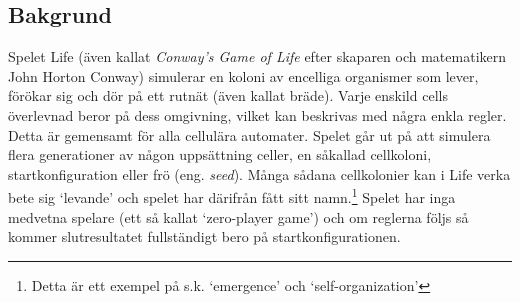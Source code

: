 



%
%

\subsection{Bakgrund}

Spelet Life (även kallat \emph{Conway's Game of Life} efter skaparen och matematikern John Horton Conway) simulerar en koloni av encelliga organismer som lever, förökar sig och dör på ett rutnät (även kallat bräde). Varje enskild cells överlevnad beror på dess omgivning, vilket kan beskrivas med några enkla regler. Detta är gemensamt för alla cellulära automater. Spelet går ut på att simulera flera generationer av någon uppsättning celler, en såkallad cellkoloni, startkonfiguration eller frö (eng. \textit{seed}). Många sådana cellkolonier kan i Life verka bete sig `levande' och spelet har därifrån fått sitt namn.\footnote{Detta är ett exempel på s.k. `emergence' och `self-organization'} Spelet har inga medvetna spelare (ett så kallat `zero-player game') och om reglerna följs så kommer slutresultatet fullständigt bero på startkonfigurationen.

